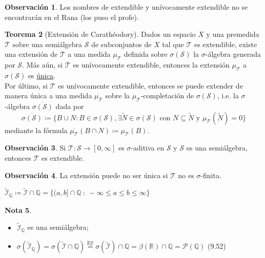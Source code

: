 \documentclass[11pt]{article}
\theoremstyle{definition} %
\newtheorem{theorem}{Teorema}[section]
\newtheorem{remark}[theorem]{Observación}
\newtheorem{note}[theorem]{Nota}
\newcommand{\R}{\mathbb{R}}
\newcommand{\Q}{\mathbb{Q}}
\begin{document}
\begin{property}
\begin{remark}
	Los nombres de extendible y unívocamente extendible no se encontrarán en el Rana (los puso el profe).
\end{remark}

\begin{theorem}[Extensión de Carathéodory]
	Dados un espacio $X$ y una premedida $\mathcal{T}$ sobre una semiálgebra $\mathscr{S}$ de subconjuntos de $X$ tal que $\mathcal{T}$ es extendible, existe una extensión de $\mathcal{T}$ a una medida $\mu_{\mathcal{T}}$ definida sobre $\sigma(\mathscr{S})$ la $\sigma$-álgebra generada por $\mathscr{S}$. Más aún, si $\mathcal{T}$ es unívocamente extendible, entonces la extensión $\mu_{\mathcal{T}}$ a $\sigma(\mathscr{S})$ es \underline{única}. \\
	Por último, si $\mathcal{T}$ es unívocamente extendible, entonces se puede extender de manera única a una medida $\overline{\mu_{\mathcal{T}}}$ sobre la $\mu_{\mathcal{T}}$-completación de $\sigma(\mathscr{S})$, i.e. la $\sigma$-álgebra $\overline{\sigma(\mathscr{S})}$ dada por
	\[ \overline{\sigma(\mathscr{S})} \coloneq \{ B \cup N : B \in \sigma(\mathscr{S}), \exists \widetilde{N} \in \sigma(\mathscr{S}) \text{ con } N \subseteq \widetilde{N} \text{ y } \mu_{\mathcal{T}} (\widetilde{N}) = 0 \} \]
	\noindent mediante la fórmula $\overline{\mu_{\mathcal{T}}}(B\cap N) \coloneq \mu_{\mathcal{T}}(B)$.
\end{theorem}

\begin{remark}
	Si $\mathcal{T} : \mathscr{S} \to [0,\infty]$ es $\sigma$-aditiva en $\mathscr{S}$ y $\mathscr{S}$ es una semiálgebra, entonces $\mathcal{T}$ es extendible.
\end{remark}

\begin{remark}
	La extensión puede no ser única si $\mathcal{T}$ no es $\sigma$-finita.
\end{remark}
\begin{eg}
	$\widetilde{\mathcal{I}}_{\Q} \coloneq \widetilde{\mathcal{I}} \cap \Q = \{ (a,b] \cap \Q \ : \ -\infty \leq a \leq b \leq \infty \}$ 
\end{eg}

\begin{note}~
	\begin{itemize}
		\item $\widetilde{\mathcal{I}}_{\Q}$ es una semiálgebra;

		\item $\sigma (\widetilde{\mathcal{I}}_{\Q}) = \sigma (\widetilde{\mathcal{I}} \cap \Q) \stackrel{\text{Ej!}}{=} \sigma (\widetilde{\mathcal{I}}) \cap \Q = \beta(\R) \cap \Q = \mathcal{P}(\Q)$ (9.52)


\end{itemize}
\end{note}
\end{property}
\end{document}
